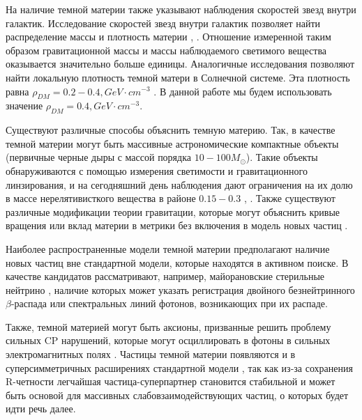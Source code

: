 На наличие темной материи также указывают наблюдения скоростей звезд внутри галактик. Исследование скоростей звезд внутри галактик позволяет найти распределение массы и плотность материи \cite{Radial_velocity_measurements}, \cite{Angular_Velocity}. Отношение измеренной таким образом гравитационной массы и массы наблюдаемого светимого вещества оказывается значительно больше единицы. Аналогичные исследования позволяют найти локальную плотность темной матери в Солнечной системе. Эта плотность равна $\rho_{DM} = 0.2 - 0.4, GeV \cdot cm^{-3}$ \cite{palau2022oblateness}. В данной работе мы будем использовать значение  $\rho_{DM} = 0.4, GeV \cdot  cm^{-3}$.


Существуют различные способы объяснить темную материю. Так, в качестве темной материи могут быть массивные астрономические компактные объекты (первичные черные дыры с массой порядка $10-100M_{\odot}$). Такие объекты обнаруживаются с помощью измерения светимости и гравитационного линзирования, и на сегодняшний день наблюдения дают ограничения на их долю в массе нерелятивисткого вещества в районе $0.15-0.3$ \cite{Zumalac_rregui_2018}, \cite{Blaineau_2022}.
Также существуют различные модификации теории гравитации, которые могут объяснить кривые вращения или вклад материи в метрики без включения в модель новых частиц \cite{1984ApJ...286....7B}.


Наиболее распространенные модели темной материи предполагают наличие новых частиц вне стандартной модели, которые находятся в активном поиске. В качестве кандидатов рассматривают, например, майорановские стерильные нейтрино \cite{Boyarsky_2019}, наличие которых может указать регистрация двойного безнейтринного $\beta$-распада или спектральных линий фотонов, возникающих при их распаде. 

Также, темной материей могут быть аксионы, призванные решить проблему сильных CP нарушений, которые могут осциллировать в фотоны в сильных электромагнитных полях \cite{adams2023axion}. Частицы темной материи появляются и в суперсимметричных расширениях стандартной	 модели \cite{berezinsky1996dark}, так как из-за сохранения R-четности легчайшая частица-суперпартнер становится стабильной и может быть основой для массивных слабовзаимодействующих частиц, о которых будет идти речь далее.

